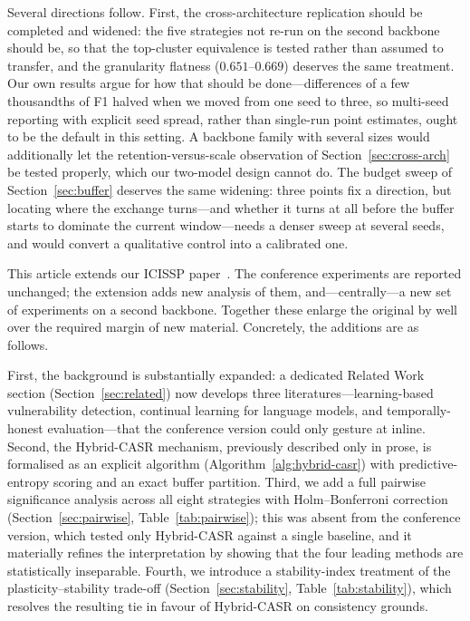 
Several directions follow. First, the cross-architecture replication should be completed and widened: the five strategies not re-run on the second backbone should be, so that the top-cluster equivalence is tested rather than assumed to transfer, and the granularity flatness ($0.651$--$0.669$) deserves the same treatment. Our own results argue for how that should be done---differences of a few thousandths of F1 halved when we moved from one seed to three, so multi-seed reporting with explicit seed spread, rather than single-run point estimates, ought to be the default in this setting. A backbone family with several sizes would additionally let the retention-versus-scale observation of Section~\ref{sec:cross-arch} be tested properly, which our two-model design cannot do. The budget sweep of Section~\ref{sec:buffer} deserves the same widening: three points fix a direction, but locating where the exchange turns---and whether it turns at all before the buffer starts to dominate the current window---needs a denser sweep at several seeds, and would convert a qualitative control into a calibrated one.



This article extends our ICISSP paper~\citep{Dou2026ICISSP}. The conference experiments are reported unchanged; the extension adds new analysis of them, and---centrally---a new set of experiments on a second backbone. Together these enlarge the original by well over the required margin of new material. Concretely, the additions are as follows.

First, the background is substantially expanded: a dedicated Related Work section (Section~\ref{sec:related}) now develops three literatures---learning-based vulnerability detection, continual learning for language models, and temporally-honest evaluation---that the conference version could only gesture at inline. Second, the Hybrid-CASR mechanism, previously described only in prose, is formalised as an explicit algorithm (Algorithm~\ref{alg:hybrid-casr}) with predictive-entropy scoring and an exact buffer partition. Third, we add a full pairwise significance analysis across all eight strategies with Holm--Bonferroni correction (Section~\ref{sec:pairwise}, Table~\ref{tab:pairwise}); this was absent from the conference version, which tested only Hybrid-CASR against a single baseline, and it materially refines the interpretation by showing that the four leading methods are statistically inseparable. Fourth, we introduce a stability-index treatment of the plasticity--stability trade-off (Section~\ref{sec:stability}, Table~\ref{tab:stability}), which resolves the resulting tie in favour of Hybrid-CASR on consistency grounds.

